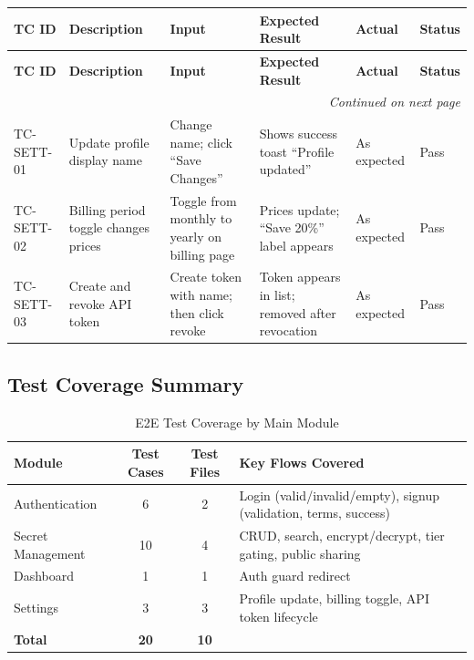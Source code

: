 \documentclass[12pt,a4paper]{article}
\begin{document}
{\footnotesize
\begin{longtable}{@{}p{1.4cm}p{2.6cm}p{3.3cm}p{3.8cm}p{1.4cm}p{0.8cm}@{}}
  \toprule
  \textbf{TC ID} & \textbf{Description} & \textbf{Input} & \textbf{Expected Result} & \textbf{Actual} & \textbf{Status} \\
  \midrule
  \endfirsthead
  \toprule
  \textbf{TC ID} & \textbf{Description} & \textbf{Input} & \textbf{Expected Result} & \textbf{Actual} & \textbf{Status} \\
  \midrule
  \endhead
  \hline
  \multicolumn{6}{r}{\textit{Continued on next page}} \\
  \endfoot
  \bottomrule
  \endlastfoot

  TC-SETT-01 &
  Update profile display name &
  Change name; click ``Save Changes'' &
  Shows success toast ``Profile updated'' &
  As expected &
  Pass \\
  \hline

  TC-SETT-02 &
  Billing period toggle changes prices &
  Toggle from monthly to yearly on billing page &
  Prices update; ``Save 20\%'' label appears &
  As expected &
  Pass \\
  \hline

  TC-SETT-03 &
  Create and revoke API token &
  Create token with name; then click revoke &
  Token appears in list; removed after revocation &
  As expected &
  Pass \\
\end{longtable}
}

\subsection{Test Coverage Summary}

\begin{table}[H]
  \centering
  \small
  \caption{E2E Test Coverage by Main Module}
  \begin{tabular}{@{}lccp{5.5cm}@{}}
    \toprule
    \textbf{Module} & \textbf{Test Cases} & \textbf{Test Files} & \textbf{Key Flows Covered} \\
    \midrule
    Authentication    & 6 & 2 & Login (valid/invalid/empty), signup (validation, terms, success) \\
    \hline
    Secret Management & 10 & 4 & CRUD, search, encrypt/decrypt, tier gating, public sharing \\
    \hline
    Dashboard         & 1 & 1 & Auth guard redirect \\
    \hline
    Settings          & 3 & 3 & Profile update, billing toggle, API token lifecycle \\
    \hline
    \textbf{Total}    & \textbf{20} & \textbf{10} & \\
    \bottomrule
  \end{tabular}
\end{table}
\end{document}

